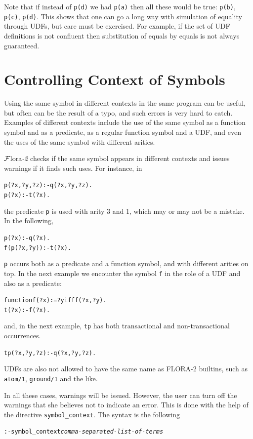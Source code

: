 \documentclass[11pt]{article}
\newcommand{\FLORA}{{\mbox{\sc ${\cal F}${lora}\rm\emph{-2}}}\xspace}
\begin{document}
Note that if instead of \texttt{p(d)} we had \texttt{p(a)} then all these
would be true: \texttt{p(b)}, \texttt{p(c)}, \texttt{p(d)}.
This shows that one can go a long way
with simulation of equality through UDFs, but care must be exercised.
For example, if the set of UDF definitions is not confluent then
substitution of equals by equals is not always guaranteed.


\section{Controlling Context of Symbols} \label{sec:symbol}


Using the same symbol in different contexts in the same program can be
useful, but often can be the result of a typo, and such errors is very hard
to catch. Examples of different contexts include the use of the same symbol
as a function symbol and as a predicate, as a regular function symbol and a
UDF, and even the uses of the same symbol with different arities.

\FLORA checks if the same symbol appears in different contexts
and issues warnings if it finds such uses. For instance, in
\begin{alltt}
	p(?x,?y,?z):-q(?x,?y,?z).
	p(?x):-t(?x).
\end{alltt}
the predicate \texttt{p} is used with arity 3 and 1, which may or may not be a
mistake. In the following,
\begin{alltt}
	p(?x):-q(?x).
	f(p(?x,?y)):-t(?x).
\end{alltt}
\texttt{p} occurs both as a predicate and a function symbol, and with
different arities on top. In the next example we encounter the symbol
\texttt{f} in the role of a UDF and also as a predicate:  
\begin{alltt}
	function f(?x):=?y if ff(?x,?y).
	t(?x):-f(?x).
\end{alltt}
and, in the next example, \texttt{tp} has both transactional and
non-transactional occurrences. 
\begin{alltt}
	tp(?x,?y,?z):-q(?x,?y,?z).
\end{alltt}
UDFs are also not allowed to have the same name as FLORA-2 builtins, such
as \texttt{atom/1}, \texttt{ground/1} and the like.  


In all these cases, warnings will be issued. However, the user can turn off
the warnings that she believes not to indicate an error. This is done with
the help of the directive
\texttt{symbol\_context}.  The syntax is the following
\begin{alltt}
:- symbol_context \textnormal{\emph{comma-separated-list-of-terms}}
\end{alltt}
\end{document}
